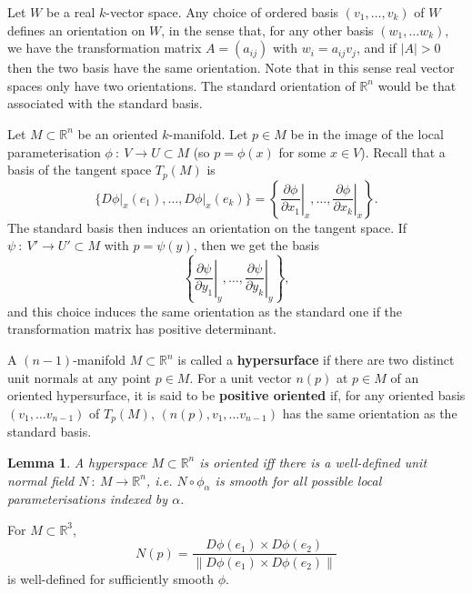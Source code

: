 \documentclass[letter-paper]{tufte-book}
\newtheorem{lemma}[theorem]{\color{pastel-blue}Lemma}
\newenvironment{example}[1][Example]{\begin{trivlist}
\item[\hskip \labelsep {\bfseries #1}]}{\end{trivlist}}
\begin{document}
Let $W$ be a real $k$-vector space. Any choice of ordered basis $(v_1, \ldots, v_k)$ of $W$ defines an orientation on $W$, in the sense that, for any other basis $(w_1, \ldots w_k)$, we have the transformation matrix $A = (a_{ij})$ with $w_i = a_{ij}v_j$, and if $|A| > 0$ then the two basis have the same orientation. Note that in this sense real vector spaces only have two orientations. The standard orientation of $\mathbb{R}^n$ would be that associated with the standard basis.

Let $M \subset \mathbb{R}^n$ be an oriented $k$-manifold. Let $p \in M$ be in the image of the local parameterisation $\phi\ :\ V \to U \subset{M}$ (so $p = \phi(x)$ for some $x\in V$). Recall that a basis of the tangent space $T_p(M)$ is
\begin{equation*}
  \{\left.D\phi\right|_x (e_1), \ldots, \left.D\phi\right|_x (e_k)\} = \left\{\left.\frac{\partial \phi}{\partial x_1}\right|_x, \ldots, \left.\frac{\partial \phi}{\partial x_k}\right|_x\right\}.
\end{equation*}
The standard basis then induces an orientation on the tangent space. If $\psi\ :\ V' \to U' \subset M$ with $p = \psi(y)$, then we get the basis
\begin{equation*}
  \left\{\left.\frac{\partial \psi}{\partial y_1}\right|_y, \ldots, \left.\frac{\partial \psi}{\partial y_k}\right|_y\right\},
\end{equation*}
and this choice induces the same orientation as the standard one if the transformation matrix has positive determinant.

A $(n-1)$-manifold $M \subset \mathbb{R}^n$ is called a \textbf{hypersurface} if there are two distinct unit normals at any point $p \in M$. For a unit vector $n(p)$ at $p\in M$ of an oriented hypersurface, it is said to be \textbf{positive oriented} if, for any oriented basis $(v_1, \ldots v_{n-1})$ of $T_p(M)$, $(n(p), v_1, \ldots v_{n-1})$ has the same orientation as the standard basis.

\begin{lemma}
  A hyperspace $M \subset \mathbb{R}^n$ is oriented iff there is a well-defined unit normal field $N\ :\ M \to \mathbb{R}^n$, i.e. $N \circ \phi_\alpha$ is smooth for all possible local parameterisations indexed by $\alpha$.
\end{lemma}

\begin{example}
  For $M \subset \mathbb{R}^3$,
  \begin{equation*}
    N(p) = \frac{D\phi(e_1) \times D\phi(e_2)}{\| D\phi(e_1) \times D\phi(e_2)\|}
  \end{equation*}
  is well-defined for sufficiently smooth $\phi$.
\end{example}
\end{document}

